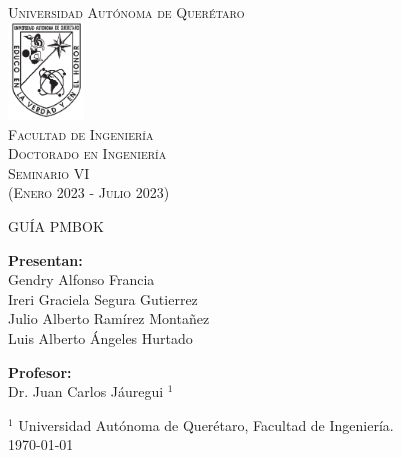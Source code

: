 \documentclass[letterpaper,12pt,openright,oneside]{article}
\theoremstyle{plain}
\begin{document}



\begin{titlepage}
\begin{center}



\textsc{\LARGE Universidad Autónoma de Querétaro}\\[1 cm]
\includegraphics[width=0.15\textwidth]{./uaqlogo}~\\[0.75cm]
\textsc{\Large Facultad de Ingeniería \\ \large{Doctorado en Ingeniería}}\\[0.5 cm]
\textsc{\large Seminario VI \\ (Enero 2023 - Julio 2023)}\\[0.5cm]

{ 

\huge \bfseries 

GUÍA PMBOK
\\[0.4cm] }
\vspace*{1.0cm}

\large \textbf{Presentan:} \\
\large \textbf{} Gendry Alfonso Francia\\\vspace*{0.5cm}
Ireri Graciela Segura Gutierrez\\\vspace*{0.5cm}
\large \textbf{} Julio Alberto Ramírez Montañez\\\vspace*{0.5cm}
\large \textbf{} Luis Alberto Ángeles Hurtado\\\vspace*{0.5cm}

\textbf{Profesor:} \\ Dr. Juan Carlos Jáuregui $^{1}$\\\vspace*{0.5cm}
\raggedright
$^{1}$ Universidad Autónoma de Querétaro, Facultad de Ingeniería.\\
\vfill
\centering
{\large \today}
\end{center}
\end{titlepage}
\end{document}
